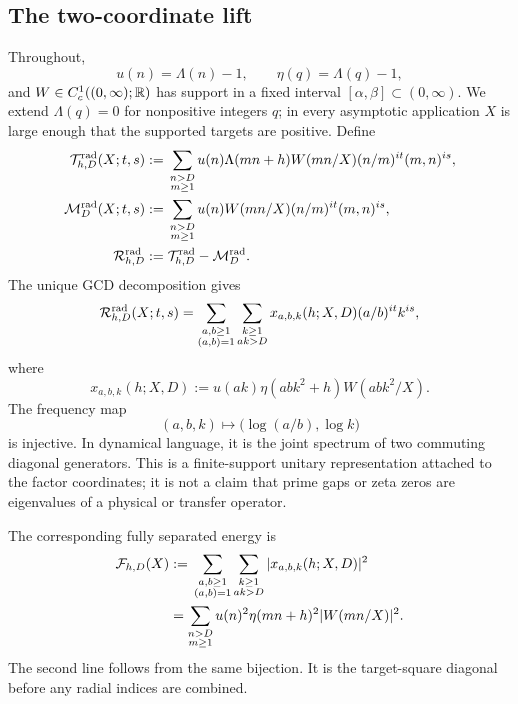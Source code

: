 \subsection{The two-coordinate lift}

Throughout,
\[
 u(n)=\Lambda(n)-1,
 \qquad \eta(q)=\Lambda(q)-1,
\]
and $W\in C_c^1((0,\infty);\mathbb R)$ has support in a fixed interval
$[\alpha,\beta]\subset(0,\infty)$.  We extend
$\Lambda(q)=0$ for nonpositive integers $q$; in every asymptotic
application $X$ is large enough that the supported targets are positive.
Define
\begin{align}
 \mathcal T^{\mathrm{rad}}_{h,D}(X;t,s)
 &:={}
 \sum_{\substack{n>D\\m\geq1}}
 u(n)\Lambda(mn+h)W(mn/X)(n/m)^{it}(m,n)^{is},
 \label{eq:intro-raw-radial-transform}\\
 \mathcal M^{\mathrm{rad}}_{D}(X;t,s)
 &:={}
 \sum_{\substack{n>D\\m\geq1}}
 u(n)W(mn/X)(n/m)^{it}(m,n)^{is},
 \label{eq:intro-radial-model}\\
 \mathcal R^{\mathrm{rad}}_{h,D}
 &:={}\mathcal T^{\mathrm{rad}}_{h,D}-\mathcal M^{\mathrm{rad}}_{D}.
 \label{eq:intro-centered-radial-transform}
\end{align}
The unique GCD decomposition gives
\begin{equation}
 \mathcal R^{\mathrm{rad}}_{h,D}(X;t,s)
 =\sum_{\substack{a,b\geq1\\(a,b)=1}}
 \sum_{\substack{k\geq1\\ak>D}}
 x_{a,b,k}(h;X,D)(a/b)^{it}k^{is},
 \label{eq:intro-joint-expansion}
\end{equation}
where
\begin{equation}
 x_{a,b,k}(h;X,D)
 :=u(ak)\eta(abk^2+h)W(abk^2/X).
 \label{eq:intro-joint-coefficient}
\end{equation}
The frequency map
\[
 (a,b,k)\longmapsto
 \bigl(\log(a/b),\log k\bigr)
\]
is injective.  In dynamical language, it is the joint spectrum of two
commuting diagonal generators.  This is a finite-support unitary
representation attached to the factor coordinates; it is not a claim
that prime gaps or zeta zeros are eigenvalues of a physical or transfer
operator.

The corresponding fully separated energy is
\begin{align}
 \mathcal F_{h,D}(X)
 &:={}
 \sum_{\substack{a,b\geq1\\(a,b)=1}}
 \sum_{\substack{k\geq1\\ak>D}}
 |x_{a,b,k}(h;X,D)|^2
 \label{eq:intro-radial-energy}\\
 &=\sum_{\substack{n>D\\m\geq1}}
 u(n)^2\eta(mn+h)^2|W(mn/X)|^2.
 \label{eq:intro-factor-pair-energy}
\end{align}
The second line follows from the same bijection.  It is the target-square
diagonal before any radial indices are combined.

